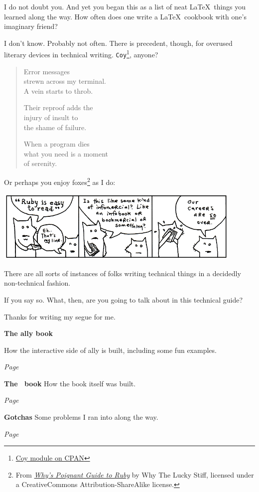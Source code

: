 \begin{paracol}{2}
\begin{leftcolumn}
\begin{ally}
  I do not doubt you. And yet you began this as a list of neat \LaTeX\ things you learned along the way. How often does one write a \LaTeX\ cookbook with one's imaginary friend?
\end{ally}
I don't know. Probably not often. There is precedent, though, for overused literary devices in technical writing. \texttt{Coy}\footnote{\href{https://metacpan.org/pod/Coy}{Coy module on CPAN}}, anyone? 

\begin{verse}
  Error messages\\
  strewn across my terminal.\\
  A vein starts to throb. 
   
  Their reproof adds the\\
  injury of insult to\\
  the shame of failure. 
   
  When a program dies\\
  what you need is a moment\\
  of serenity. 
\end{verse}

\noindent Or perhaps you enjoy foxes\footnote{From \href{https://poignant.guide}{\emph{Why's Poignant Guide to Ruby}} by Why The Lucky Stiff, licensed under a CreativeCommons Attribution-ShareAlike license.} as I do:

\noindent\includegraphics[width=4.7in]{assets/the.foxes-3.png}

There are all sorts of instances of folks writing technical things in a decidedly non-technical fashion.

\begin{ally}
  If you say so. What, then, are you going to talk about in this technical guide?
\end{ally}
Thanks for writing my segue for me.

\begin{labeling}{\textbf{The ally book}}
  \item[\textbf{\allyId}] How the interactive side of ally is built, including some fun examples.

  \emph{Page \pageref{site}}
  \item[\textbf{The \allyWord\ book}] How the book itself was built.

  \emph{Page \pageref{book}}
  \item[\textbf{Gotchas}] Some problems I ran into along the way.

  \emph{Page \pageref{gotchas}}
\end{labeling}

\end{leftcolumn}
\end{paracol}
